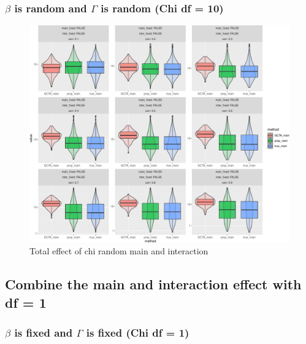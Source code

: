 \documentclass[]{article}
\begin{document}
\clearpage

\subsubsection{\texorpdfstring{\(\beta\) is random and \(\Gamma\) is
random (Chi df =
10)}{\textbackslash{}beta is random and \textbackslash{}Gamma is random (Chi df = 10)}}\label{beta-is-random-and-gamma-is-random-chi-df-10}

\begin{figure}
\centering
\includegraphics{Simulation_report_files/figure-latex/main_random_random_chi_combine_df_10-1.pdf}
\caption{Total effect of chi random main and interaction}
\end{figure}

\newpage

\subsection{Combine the main and interaction effect with df =
1}\label{combine-the-main-and-interaction-effect-with-df-1}

\subsubsection{\texorpdfstring{\(\beta\) is fixed and \(\Gamma\) is
fixed (Chi df =
1)}{\textbackslash{}beta is fixed and \textbackslash{}Gamma is fixed (Chi df = 1)}}\label{beta-is-fixed-and-gamma-is-fixed-chi-df-1}
\end{document}
